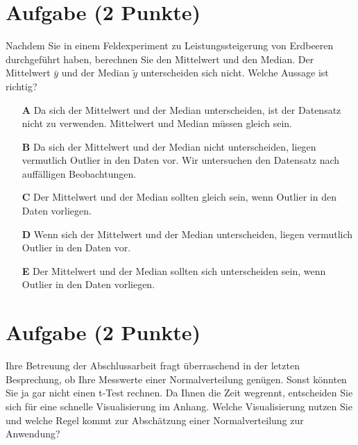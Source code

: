 \documentclass[a4paper, 9pt]{scrartcl}\usepackage[]{graphicx}\usepackage[]{xcolor}
\begin{document}
\section{Aufgabe \hfill (2 Punkte)}



Nachdem Sie in einem Feldexperiment zu Leistungssteigerung von Erdbeeren durchgeführt haben, berechnen Sie den Mittelwert und den Median. Der Mittelwert $\bar{y}$ und der Median $\tilde{y}$ unterscheiden sich nicht. Welche Aussage ist richtig?



\begin{enumerate}
\item [\textbf{A} \msquare] Da sich der Mittelwert und der Median unterscheiden, ist der Datensatz nicht zu verwenden. Mittelwert und Median müssen gleich sein.
\item [\textbf{B} \msquare] Da sich der Mittelwert und der Median nicht unterscheiden, liegen vermutlich Outlier in den Daten vor. Wir untersuchen den Datensatz nach auffälligen Beobachtungen.
\item [\textbf{C} \msquare] Der Mittelwert und der Median sollten gleich sein, wenn Outlier in den Daten vorliegen. 
\item [\textbf{D} \msquare] Wenn sich der Mittelwert und der Median unterscheiden, liegen vermutlich Outlier in den Daten vor.
\item [\textbf{E} \msquare] Der Mittelwert und der Median sollten sich unterscheiden sein, wenn Outlier in den Daten vorliegen. 
\end{enumerate}

\section{Aufgabe \hfill (2 Punkte)}



Ihre Betreuung der Abschlussarbeit fragt überraschend in der letzten Besprechung, ob Ihre Messwerte einer Normalverteilung genügen. Sonst könnten Sie ja gar nicht einen t-Test rechnen. Da Ihnen die Zeit wegrennt, entscheiden Sie sich für eine schnelle Visualisierung im Anhang. Welche Visualisierung nutzen Sie und welche Regel kommt zur Abschätzung einer Normalverteilung zur Anwendung?
\end{document}
